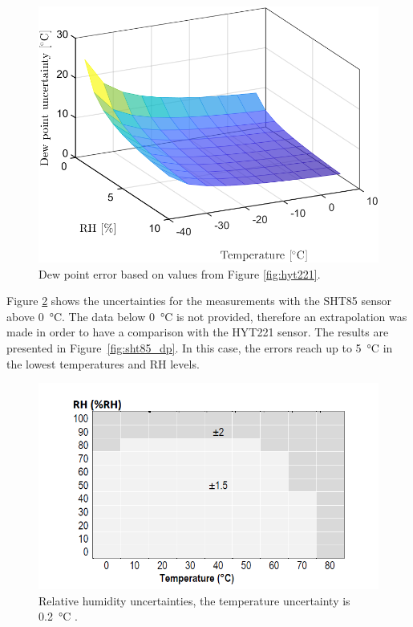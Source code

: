 \begin{figure}[!h]
\centering
\includegraphics[width=0.6\columnwidth]{Chapter5/images/HYT221RH7T15.png}
\caption{Dew point error based on values from Figure \ref{fig:hyt221}.}
\label{fig:hyt221_dp}
\end{figure}
\newpage
Figure \ref{fig:sht85} shows the uncertainties for the measurements with the SHT85 sensor above \SI{0}{\celsius}. The data below \SI{0}{\celsius} is not provided, therefore an extrapolation was made in order to have a comparison with the HYT221 sensor. The results are presented in Figure~\ref{fig:sht85_dp}. In this case, the errors reach up to \SI{5}{\celsius} in the lowest temperatures and \gls{RH} levels.
\begin{figure}[!h]
\centering
\includegraphics[width=0.65\columnwidth]{Chapter5/images/sht85_rh.png}
\caption{Relative humidity uncertainties, the temperature uncertainty is \SI{0.2}{\celsius} \cite{SHT85}.}
\label{fig:sht85}
\end{figure}

